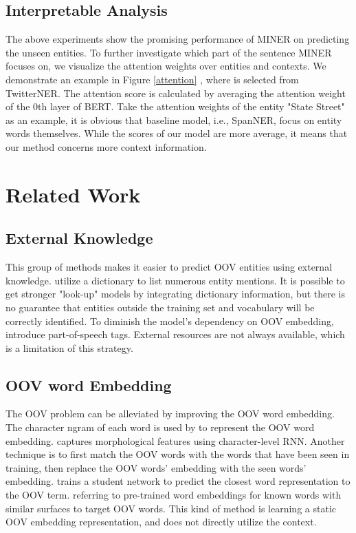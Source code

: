\documentclass[11pt]{article}
\begin{document}
\subsection{Interpretable Analysis}
The above experiments show the promising performance of MINER on predicting the unseen entities. To further investigate which part of the sentence MINER focuses on, we visualize the attention weights over entities and contexts. We demonstrate an example in Figure \ref{attention} , where is selected from TwitterNER. The attention score is calculated by averaging the attention weight of the 0th layer of BERT. Take the attention weights of the entity "State Street" as an example, it is obvious that baseline model, i.e., SpanNER, focus on entity words themselves. While the scores of our model are more average, it means that our method concerns more context information.  

\section{Related Work}
\subsection{External Knowledge}
This group of methods makes it easier to predict OOV entities using external knowledge. \citet{zhang-yang-2018-chinese} utilize a dictionary to list numerous entity mentions. It is possible to get stronger "look-up" models by integrating dictionary information, but there is no guarantee that entities outside the training set and vocabulary will be correctly identified. To diminish the model's dependency on OOV embedding, \citet{li-etal-2018-self} introduce part-of-speech tags. External resources are not always available, which is a limitation of this strategy.


\subsection{OOV word Embedding}
The OOV problem can be alleviated by improving the OOV word embedding. The character ngram of each word is used by \citet{bojanowski-etal-2017-enriching} to represent the OOV word embedding. \citet{pinter-etal-2017-mimicking} captures morphological features using character-level RNN. Another technique is to first match the OOV words with the words that have been seen in training, then replace the OOV words' embedding with the seen words' embedding. \citet{peng2019learning} trains a student network to predict the closest word representation to the OOV term. \citet{fukuda-etal-2020-robust} referring to pre-trained word embeddings for known words with similar surfaces to target OOV words. This kind of method is learning a static OOV embedding representation, and does not directly utilize the context.
\end{document}
